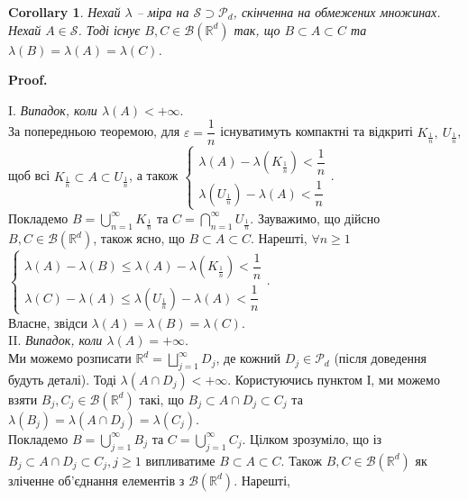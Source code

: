 \documentclass[a4paper, 10pt]{article}
\makeatletter
\theoremstyle{theoremdd}
\newtheorem{corollary}[theorem]{Corollary}
\renewenvironment{proof}[1][Proof.\\]{\par
\pushQED{\hfill \qed}%
\normalfont \topsep6\p@\@plus6\p@\relax
\trivlist
\item\relax
{\bfseries
#1\@addpunct{.}}\hspace\labelsep\ignorespaces
}{%
\popQED\endtrivlist\@endpefalse
}
\makeatother
\begin{document}
\begin{corollary}
Нехай $\lambda$ -- міра на $\mathcal{S} \supset \mathcal{P}_d$, скінченна на обмежених множинах. Нехай $A \in \mathcal{S}$. Тоді існує $B,C \in \mathcal{B}(\mathbb{R}^d)$ так, що $B \subset A \subset C$ та $\lambda(B) = \lambda(A) = \lambda(C)$.
\end{corollary}

\begin{proof}
I. \textit{Випадок, коли $\lambda(A) < +\infty$}.\\
За попередньою теоремою, для $\varepsilon = \dfrac{1}{n}$ існуватимуть компактні та відкриті $K_{\frac{1}{n}},\ U_{\frac{1}{n}}$, щоб всі $K_{\frac{1}{n}} \subset A \subset U_{\frac{1}{n}}$, а також $\begin{cases} \lambda(A) - \lambda(K_{\frac{1}{n}}) < \dfrac{1}{n} \\ \lambda(U_{\frac{1}{n}}) - \lambda(A) < \dfrac{1}{n} \end{cases}$.\\
Покладемо $B = \displaystyle\bigcup_{n=1}^\infty K_{\frac{1}{n}}$ та $C = \displaystyle\bigcap_{n=1}^\infty U_{\frac{1}{n}}$. Зауважимо, що дійсно $B,C \in \mathcal{B}(\mathbb{R}^d)$, також ясно, що $B \subset A \subset C$. Нарешті, $\forall n \geq 1$\\
$\begin{cases} \lambda(A) - \lambda(B) \leq \lambda(A) - \lambda(K_{\frac{1}{n}}) < \dfrac{1}{n} \\ \lambda(C) - \lambda(A) \leq \lambda(U_{\frac{1}{n}}) - \lambda(A) < \dfrac{1}{n} \end{cases}$.\\
Власне, звідси $\lambda(A) = \lambda(B) = \lambda(C)$.
\bigskip \\
II. \textit{Випадок, коли $\lambda(A) = +\infty$}.\\
Ми можемо розписати $\mathbb{R}^d = \displaystyle\bigsqcup_{j=1}^\infty D_j$, де кожний $D_j \in \mathcal{P}_d$ (після доведення будуть деталі). Тоді $\lambda(A \cap D_j) < +\infty$. Користуючись пунктом І, ми можемо взяти $B_j,C_j \in \mathcal{B}(\mathbb{R}^d)$ такі, що $B_j \subset A \cap D_j \subset C_j$ та $\lambda(B_j) = \lambda(A \cap D_j) = \lambda(C_j)$.\\
Покладемо $B = \displaystyle\bigcup_{j=1}^\infty B_j$ та $C = \displaystyle\bigcup_{j=1}^\infty C_j$. Цілком зрозуміло, що із $B_j \subset A \cap D_j \subset C_j, j \geq 1$ випливатиме $B \subset A \subset C$. Також $B,C \in \mathcal{B}(\mathbb{R}^d)$ як зліченне об'єднання елементів з $\mathcal{B}(\mathbb{R}^d)$. Нарешті,\\

\end{proof}
\end{document}
